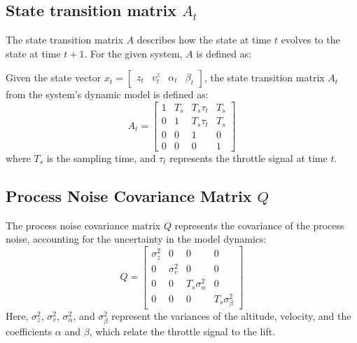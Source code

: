 \documentclass{article}
\begin{document}


\subsection{State transition matrix \( A_t \)}
The state transition matrix \( A \) describes how the state at time \( t \) evolves to the state at time \( t+1 \). For the given system, \( A \) is defined as:

Given the state vector \( x_t = \begin{bmatrix} z_t&  v_t^z&  \alpha_t&  \beta_t \end{bmatrix} \), the state transition matrix \( A_t \) from the system's dynamic model is defined as:
\begin{equation}
A_t = 
\begin{bmatrix}
1 & T_s & T_s \tau_t & T_s \\
0 & 1 & T_s \tau_t & T_s \\
0 & 0 & 1 & 0 \\
0 & 0 & 0 & 1
\end{bmatrix}
\end{equation}
where \( T_s \) is the sampling time, and \( \tau_t \) represents the throttle signal at time \( t \).

\subsection{Process Noise Covariance Matrix \( Q \)}
The process noise covariance matrix \( Q \) represents the covariance of the process noise, accounting for the uncertainty in the model dynamics:
\begin{equation}
Q = 
\begin{bmatrix}
\sigma_z^2 & 0 & 0 & 0 \\
0 & \sigma_v^2 & 0 & 0 \\
0 & 0 & T_s \sigma_\alpha^2 & 0 \\
0 & 0 & 0 & T_s \sigma_\beta^2
\end{bmatrix}
\end{equation}
Here, \( \sigma_z^2 \), \( \sigma_v^2 \), \( \sigma_\alpha^2 \), and \( \sigma_\beta^2 \) represent the variances of the altitude, velocity, and the coefficients \( \alpha \) and \( \beta \), which relate the throttle signal to the lift.
\end{document}
